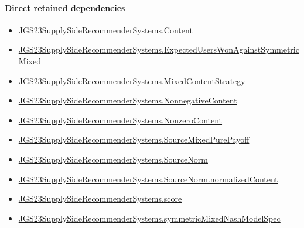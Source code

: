 \documentclass[10pt]{article}
\begin{document}
\paragraph{Direct retained dependencies}
\begin{itemize}\raggedright
\item \hyperlink{governing-declaration-367305fda50f0ada}{JGS23\allowbreak{}Supply\allowbreak{}Side\allowbreak{}Recommender\allowbreak{}Systems.\allowbreak{}Content}
\item \hyperlink{governing-declaration-3a110916ca7725ab}{JGS23\allowbreak{}Supply\allowbreak{}Side\allowbreak{}Recommender\allowbreak{}Systems.\allowbreak{}Expected\allowbreak{}Users\allowbreak{}Won\allowbreak{}Against\allowbreak{}Symmetric\allowbreak{}Mixed}
\item \hyperlink{governing-declaration-2089965d06cf0282}{JGS23\allowbreak{}Supply\allowbreak{}Side\allowbreak{}Recommender\allowbreak{}Systems.\allowbreak{}Mixed\allowbreak{}Content\allowbreak{}Strategy}
\item \hyperlink{governing-declaration-d426babe40b9593c}{JGS23\allowbreak{}Supply\allowbreak{}Side\allowbreak{}Recommender\allowbreak{}Systems.\allowbreak{}Nonnegative\allowbreak{}Content}
\item \hyperlink{governing-declaration-90e2ac7d13788c50}{JGS23\allowbreak{}Supply\allowbreak{}Side\allowbreak{}Recommender\allowbreak{}Systems.\allowbreak{}Nonzero\allowbreak{}Content}
\item \hyperlink{governing-declaration-d3239873ad21d76c}{JGS23\allowbreak{}Supply\allowbreak{}Side\allowbreak{}Recommender\allowbreak{}Systems.\allowbreak{}Source\allowbreak{}Mixed\allowbreak{}Pure\allowbreak{}Payoff}
\item \hyperlink{governing-declaration-6141339a5d3412d9}{JGS23\allowbreak{}Supply\allowbreak{}Side\allowbreak{}Recommender\allowbreak{}Systems.\allowbreak{}Source\allowbreak{}Norm}
\item \hyperlink{governing-declaration-dd171705f4075880}{JGS23\allowbreak{}Supply\allowbreak{}Side\allowbreak{}Recommender\allowbreak{}Systems.\allowbreak{}Source\allowbreak{}Norm.\allowbreak{}normalized\allowbreak{}Content}
\item \hyperlink{governing-declaration-e3725af4eb21c4db}{JGS23\allowbreak{}Supply\allowbreak{}Side\allowbreak{}Recommender\allowbreak{}Systems.\allowbreak{}score}
\item \hyperlink{paper-prerequisite-b412efba7deb757f}{JGS23\allowbreak{}Supply\allowbreak{}Side\allowbreak{}Recommender\allowbreak{}Systems.\allowbreak{}symmetric\allowbreak{}Mixed\allowbreak{}Nash\allowbreak{}Model\allowbreak{}Spec}
\end{itemize}
\end{document}
